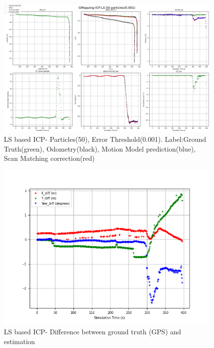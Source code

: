     \begin{figure}[h] 
        \includegraphics[height=0.6\textwidth]{images/GMapping-ICP-LS-50 particles(0.001)_PositionParameters.png}
        \caption{LS based ICP- Particles(50), Error Threshold(0.001). Label:Ground Truth(green), Odometry(black), Motion Model prediction(blue), Scan Matching correction(red)}
        \label{fig:LS_50_0.002}
    \end{figure}
    \begin{figure}[h] 
        \includegraphics[height=0.4\textwidth]{images/GMapping-ICP-LS-50 particles(0.001)_True_vs_Crct.png}
        \caption{LS based ICP- Difference between ground truth (GPS) and estimation}
        \label{fig:LS_50_0.002_diff}
    \end{figure}
\clearpage

